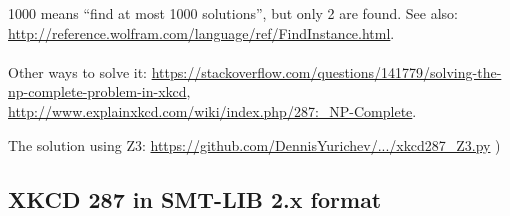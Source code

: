 1000 means ``find at most 1000 solutions'', but only 2 are found.
See also: \url{http://reference.wolfram.com/language/ref/FindInstance.html}.\\
\\
Other ways to solve it:
\url{https://stackoverflow.com/questions/141779/solving-the-np-complete-problem-in-xkcd},
\url{http://www.explainxkcd.com/wiki/index.php/287:_NP-Complete}.

The solution using Z3: \url{https://github.com/DennisYurichev/.../xkcd287_Z3.py} )

\subsection{XKCD 287 in SMT-LIB 2.x format}


